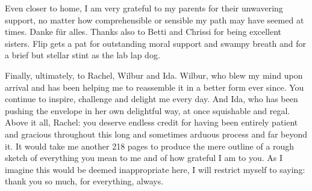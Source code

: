 Even closer to home, I am very grateful to my parents for their unwavering support, no matter how comprehensible or sensible my path may have seemed at times. Danke für alles. Thanks also to Betti and Chrissi for being excellent sisters. Flip gets a pat for outstanding moral support and swampy breath and for a brief but stellar stint as the lab lap dog.

Finally, ultimately, to Rachel, Wilbur and Ida. Wilbur, who blew my mind upon arrival and has been helping me to reassemble it in a better form ever since. You continue to inspire, challenge and delight me every day. And Ida, who has been pushing the envelope in her own delightful way, at once squishable and regal. Above it all, Rachel: you deserve endless credit for having been entirely patient and gracious throughout this long and sometimes arduous process and far beyond it. It would take me another 218 pages to produce the mere outline of a rough sketch of everything you mean to me and of how grateful I am to you. As I imagine this would be deemed inappropriate here, I will restrict myself to saying: thank you so much, for everything, always.



